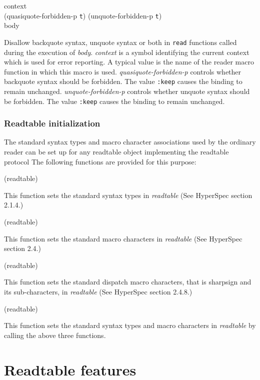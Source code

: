  {context\\
  \optional
  (quasiquote-forbidden-p \texttt{t})
  (unquote-forbidden-p \texttt{t})\\
  \body body}

Disallow backquote syntax, unquote syntax or both in \texttt{read}
functions called during the execution of \textit{body}.
\textit{context} is a symbol identifying the current context which is
used for error reporting.  A typical value is the name of the reader
macro function in which this macro is used.
\textit{quasiquote-forbidden-p} controls whether backquote syntax
should be forbidden.  The value \texttt{:keep} causes the binding to
remain unchanged.  \textit{unquote-forbidden-p} controls whether
unquote syntax should be forbidden.  The value \texttt{:keep} causes
the binding to remain unchanged.

\subsubsection{Readtable initialization}
\label{sec:readtable-initialization}

The standard syntax types and macro character associations used by the
ordinary reader can be set up for any readtable object implementing
the readtable protocol   The following
functions are provided for this purpose:

 (readtable)

This function sets the standard syntax types in \textit{readtable}
(See HyperSpec section 2.1.4.)

 (readtable)

This function sets the standard macro characters in \textit{readtable}
(See HyperSpec section 2.4.)

 (readtable)

This function sets the standard dispatch macro characters, that is
sharpsign and its sub-characters, in \textit{readtable} (See HyperSpec
section 2.4.8.)

 (readtable)

This function sets the standard syntax types and macro characters in
\textit{readtable} by calling the above three functions.

\section{Readtable features}
\label{sec:readtable-features}

